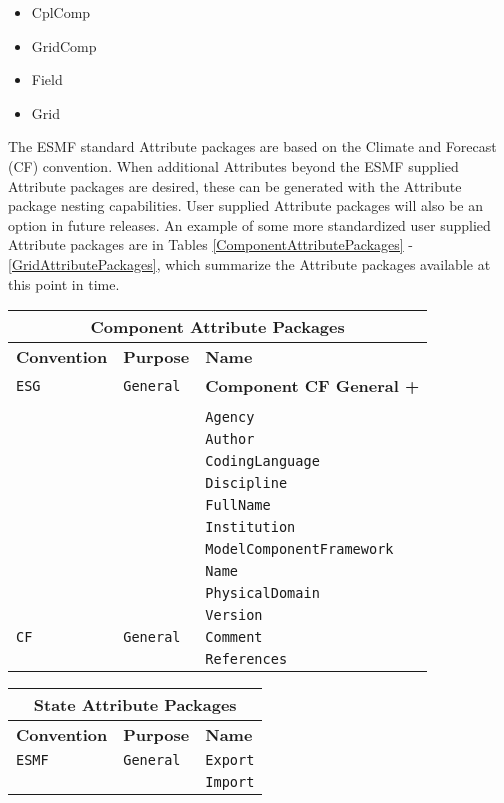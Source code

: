 \begin{itemize}
\item CplComp
\item GridComp
\item Field
\item Grid
\end{itemize}

The ESMF standard Attribute packages are based on the Climate and Forecast (CF) convention.  When additional Attributes beyond the ESMF supplied Attribute packages are desired, these can be generated with the Attribute package nesting capabilities.  User supplied Attribute packages will also be an option in future releases.  An example of some more standardized user supplied Attribute packages are in Tables \ref{ComponentAttributePackages} - \ref{GridAttributePackages}, which summarize the Attribute packages available at this point in time.

\vspace{18pt}

\begin{tabular}{|p{4cm}|p{4cm}|p{6cm}|}
\hline
\multicolumn{3}{|c|}{{\bf \large Component Attribute Packages}} \\
\hline\hline
{\bf Convention} & {\bf Purpose} & {\bf Name} \\
\hline\hline
{\tt ESG} & {\tt General} & {\bf Component CF General +} \\
     & & \\
     & & {\tt Agency} \\
     & & {\tt Author} \\
     & & {\tt CodingLanguage}  \\
     & & {\tt Discipline}  \\
     & & {\tt FullName} \\
     & & {\tt Institution} \\
     & & {\tt ModelComponentFramework} \\
     & & {\tt Name} \\
     & & {\tt PhysicalDomain}\\
     & & {\tt Version} \\ 
\hline
{\tt CF} & {\tt General} & {\tt Comment}\\
     & & {\tt References} \\
\hline
\end{tabular}
\label{ComponentAttributePackages}

\vspace{18pt}

\begin{tabular}{|p{4cm}|p{4cm}|p{6cm}|}
\hline
\multicolumn{3}{|c|}{{\bf \large State Attribute Packages}} \\
\hline\hline
{\bf Convention} & {\bf Purpose} & {\bf Name} \\
\hline\hline
{\tt ESMF} & {\tt General} & {\tt Export}  \\
 & & {\tt Import} \\ 
\hline
\end{tabular}
\label{StateAttributePackages}

